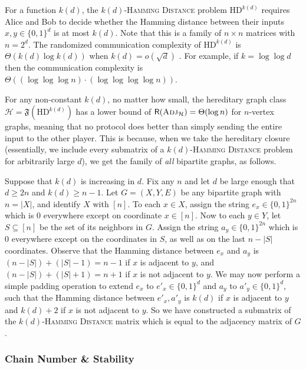 \documentclass{article}
\newcommand{\zo}{\{0,1\}}
\newcommand{\cH}{\ensuremath{\mathcal{H}}}
\newcommand{\Adj}{\textsc{Adj}}
\newcommand{\CC}{\mathsf{R}}
\begin{document}
\begin{example}
\label{example:hamming distance}
For a function $k(d)$, the \textsc{$k(d)$-Hamming Distance} problem $\mathrm{HD}^{k(d)}$ requires
Alice and Bob to decide whether the Hamming distance between their inputs $x,y \in \zo^d$ is at most
$k(d)$. Note that this is a family of $n \times n$ matrices with $n = 2^d$. The randomized
communication complexity of $\mathrm{HD}^{k(d)}$ is $\Theta(k(d) \log k(d))$ when $k(d) = o(\sqrt d)$ \cite{HSZZ06,Sag18}.
For example, if $k = \log \log d$ then the communication complexity is $\Theta( (\log\log\log n)
\cdot(\log\log\log\log n))$.

For any non-constant $k(d)$, no matter how small, the hereditary graph class $\cH =
\mathfrak{F}(\mathrm{HD}^{k(d)})$ has a lower bound of $\CC(\Adj_\cH) = \Theta(\log n)$ for
$n$-vertex graphs, meaning that no protocol does better than simply sending the entire input to the
other player. This is because, when we take the hereditary closure (essentially, we include every
submatrix of a \textsc{$k(d)$-Hamming Distance} problem for arbitrarily large $d$), we get the
family of \emph{all} bipartite graphs, as follows.

Suppose that $k(d)$ is increasing in $d$. Fix any $n$ and let $d$ be large enough that $d \geq 2n$
and $k(d) \geq n-1$.  Let $G = (X,Y,E)$ be any bipartite graph with $n = |X|$, and identify $X$ with
$[n]$. To each $x \in X$, assign the string $e_x \in \zo^{2n}$ which is 0 everywhere except on
coordinate $x \in [n]$. Now to each $y \in Y$, let $S \subseteq [n]$ be the set of its neighbors in
$G$. Assign the string $a_y \in \zo^{2n}$ which is 0 everywhere except on the coordinates in $S$, as
well as on the last $n-|S|$ coordinates. Observe that the Hamming distance between $e_x$ and $a_y$
is $(n-|S|)+(|S|-1) = n-1$ if $x$ is adjacent to $y$, and $(n-|S|) + (|S|+1) = n+1$ if $x$ is not
adjacent to $y$. We may now perform a simple padding operation to extend $e_x$ to $e'_x \in \zo^d$
and $a_y$ to $a'_y \in \zo^d$, such that the Hamming distance between $e'_x, a'_y$ is $k(d)$ if $x$
is adjacent to $y$ and $k(d) + 2$ if $x$ is not adjacent to $y$. So we have constructed a submatrix
of the \textsc{$k(d)$-Hamming Distance} matrix which is equal to the adjacency matrix of $G$.
\end{example}

\subsubsection{Chain Number \& Stability}
\end{document}

